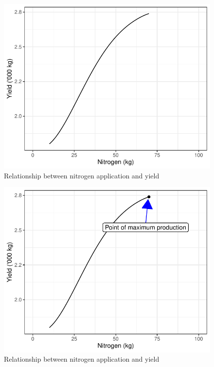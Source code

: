 \documentclass[12pt,ignorenonframetext,aspectratio=169]{beamer}
\begin{document}
\begin{frame}{}
\protect\hypertarget{section-2}{}
\begin{figure}
\includegraphics[width=0.5\linewidth]{03-production_relationship_files/figure-beamer/nitrogen-wheat-1} \caption{Relationship between nitrogen application and yield}\label{fig:nitrogen-wheat}
\end{figure}
\end{frame}

\begin{frame}{}
\protect\hypertarget{section-3}{}
\begin{figure}
\includegraphics[width=0.5\linewidth]{03-production_relationship_files/figure-beamer/nitrogen-wheat-optimum-production-1} \caption{Relationship between nitrogen application and yield}\label{fig:nitrogen-wheat-optimum-production}
\end{figure}
\end{frame}
\end{document}
